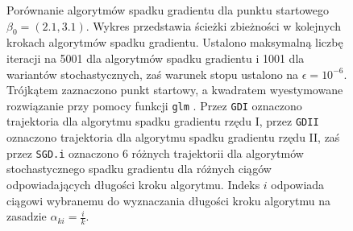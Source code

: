 \begin{figure}[hbt!]
  \caption[Porównanie algorytmów spadku gradientu dla punktu startowego $\beta_0 = (2.1,3.1)$.]{\label{fig:sc4asd}Porównanie algorytmów spadku gradientu dla punktu startowego $\beta_0 = (2.1,3.1)$. Wykres przedstawia ścieżki zbieżności w kolejnych krokach algorytmów spadku gradientu. Ustalono maksymalną liczbę iteracji na 5001 dla algorytmów spadku gradientu i 1001 dla wariantów stochastycznych, zaś warunek stopu ustalono na $\epsilon=10^{-6}$. Trójkątem zaznaczono punkt startowy, a kwadratem wyestymowane rozwiązanie przy pomocy funkcji \texttt{glm} \cite{glmglm}. Przez \texttt{GDI} oznaczono trajektoria dla algorytmu spadku gradientu rzędu I, przez \texttt{GDII} oznaczono trajektoria dla algorytmu spadku gradientu rzędu II, zaś przez \texttt{SGD.i} oznaczono 6 różnych trajektorii dla algorytmów stochastycznego spadku gradientu dla różnych ciągów odpowiadających długości kroku algorytmu. Indeks $i$ odpowiada ciągowi wybranemu do wyznaczania długości kroku algorytmu na zasadzie $\alpha_{ki} = \frac{i}{k}$.}
\end{figure}


\newpage

